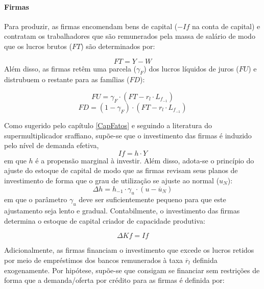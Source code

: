 \paragraph*{Firmas} Para produzir, as firmas encomendam bens de capital ($-If$ na conta de capital) e contratam os trabalhadores que são remunerados pela massa de salário de modo que os lucros brutos ($FT$) são determinados por:

\begin{equation}
    FT = Y - W
\end{equation}
Além disso, as firmas retêm uma parcela ($\gamma_F$) dos lucros líquidos de juros ($FU$) e distrubuem o restante para as famílias ($FD$):

\begin{equation}
    FU = \gamma_F\cdot (FT - r_l\cdot L_{f_{-1}})
\end{equation}
\begin{equation}
    FD = (1-\gamma_F)\cdot (FT - r_l\cdot L_{f_{-1}})
\end{equation}

Como sugerido pelo capítulo \ref{CapFatos} e seguindo a literatura do supermultiplicador sraffiano, supõe-se que o investimento das firmas é induzido pelo nível de demanda efetiva,
\begin{equation}
\label{_If}
    If = h\cdot Y
\end{equation}
em que $h$ é a propensão marginal à investir. Além disso, adota-se o princípio do ajuste do estoque de capital de modo que as firmas revisam seus planos de investimento de forma que o grau de utilização se ajuste ao normal ($u_N$):
\begin{equation}
\label{_h}
    \Delta h = h_{-1}\cdot \gamma_u\cdot (u - \overline{u}_N)
\end{equation}
em que o parâmetro $\gamma_u$ deve ser suficientemente pequeno para que este ajustamento seja lento e gradual. Contabilmente, o investimento das firmas determina o estoque de capital criador de capacidade produtiva:

\begin{equation}
    \Delta Kf = If
\end{equation}

Adicionalmente, as firmas financiam o investimento que excede os lucros retidos por meio de empréstimos dos bancos remunerados à taxa $\overline r_l$ definida exogenamente. Por hipótese, supõe-se que consigam se financiar sem restrições de forma que a demanda/oferta por crédito para as firmas é definida por:

